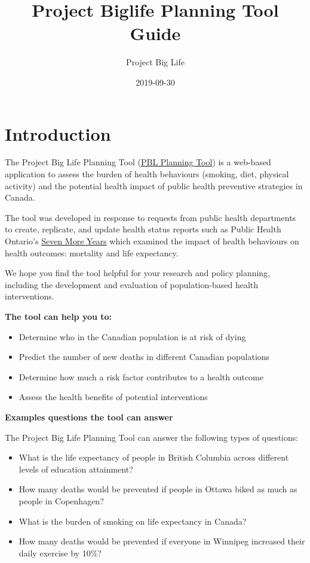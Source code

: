 \documentclass[]{book}
\title{Project Biglife Planning Tool Guide}
\author{Project Big Life}
\date{2019-09-30}
\providecommand{\tightlist}{%
  \setlength{\itemsep}{0pt}\setlength{\parskip}{0pt}}
\begin{document}
\maketitle

{
\setcounter{tocdepth}{1}
\tableofcontents
}
\hypertarget{introduction}{%
\chapter{Introduction}\label{introduction}}

The Project Big Life Planning Tool (\href{http://planning.projectbiglife.ca/}{PBL Planning Tool}) is a web-based application to assess the burden of health behaviours (smoking, diet, physical activity) and the potential health impact of public health preventive strategies in Canada.

The tool was developed in response to requests from public health departments to create, replicate, and update health status reports such as Public Health Ontario's \href{https://www.ices.on.ca/Publications/Atlases-and-Reports/2012/Seven-More-Years}{Seven More Years} which examined the impact of health behaviours on health outcomes: mortality and life expectancy.

We hope you find the tool helpful for your research and policy planning, including the development and evaluation of population-based health interventions.

\textbf{The tool can help you to:}

\begin{itemize}
\tightlist
\item
  Determine who in the Canadian population is at risk of dying
\item
  Predict the number of new deaths in different Canadian populations
\item
  Determine how much a risk factor contributes to a health outcome
\item
  Assess the health benefits of potential interventions
\end{itemize}

\textbf{Examples questions the tool can answer}

The Project Big Life Planning Tool can answer the following types of questions:

\begin{itemize}
\tightlist
\item
  What is the life expectancy of people in British Columbia across different levels of education attainment?
\item
  How many deaths would be prevented if people in Ottawa biked as much as people in Copenhagen?
\item
  What is the burden of smoking on life expectancy in Canada?
\item
  How many deaths would be prevented if everyone in Winnipeg increased their daily exercise by 10\%?
\end{itemize}
\end{document}
